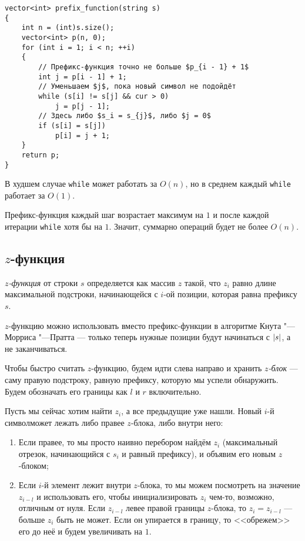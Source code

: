 \begin{verbatim}
vector<int> prefix_function(string s)
{
    int n = (int)s.size();
    vector<int> p(n, 0);
    for (int i = 1; i < n; ++i)
    {
        // Префикс-функция точно не больше $p_{i - 1} + 1$
        int j = p[i - 1] + 1;
        // Уменьшаем $j$, пока новый символ не подойдёт
        while (s[i] != s[j] && cur > 0)
            j = p[j - 1];
        // Здесь либо $s_i = s_{j}$, либо $j = 0$
        if (s[i] = s[j])
            p[i] = j + 1;
    }
    return p;
}
\end{verbatim}

В худшем случае \texttt{while} может работать за $O(n)$, но в среднем каждый \texttt{while} работает за $O(1)$.

Префикс-функция каждый шаг возрастает максимум на $1$ и после каждой итерации \texttt{while} хотя бы на $1$. Значит, суммарно операций будет не более $O(n)$.

\subsection{$z$-функция}

\begin{definition}
    \textit{$z$-функция} от строки $s$ определяется как массив $z$ такой, что $z_i$ равно длине максимальной подстроки, начинающейся с $i$-ой позиции, которая равна префиксу $s$.
\end{definition}

$z$-функцию можно использовать вместо префикс-функции в алгоритме Кнута "---Морриса "---Пратта --- только теперь нужные позиции будут начинаться с $\left\lvert s\right\rvert$, а не заканчиваться.

Чтобы быстро считать $z$-функцию, будем идти слева направо и хранить \textit{$z$-блок} --- саму правую подстроку, равную префиксу, которую мы успели обнаружить. Будем обозначать его границы как $l$ и $r$ включительно.

Пусть мы сейчас хотим найти $z_i$, а все предыдущие уже нашли. Новый $i$-й символможет лежать либо правее $z$-блока, либо внутри него:

\begin{enumerate}[nolistsep]
    \item Если правее, то мы просто наивно перебором найдём $z_i$ (максимальный отрезок, начинающийся с $s_i$ и равный префиксу), и объявим его новым $z$-блоком;
    \item Если $i$-й элемент лежит внутри $z$-блока, то мы можем посмотреть на значение $z_{i - l}$ и использовать его, чтобы инициализировать $z_i$ чем-то, возможно, отличным от нуля. Если $z_{i - l}$ левее правой границы $z$-блока, то $z_i = z_{i - l}$ --- больше $z_i$ быть не может. Если он упирается в границу, то <<обрежем>> его до неё и будем увеличивать на $1$.
\end{enumerate}

